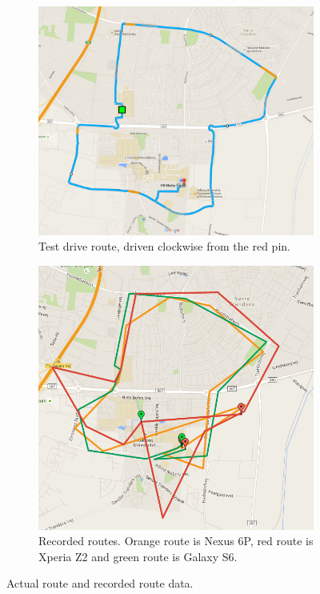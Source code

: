 \begin{figure}[h]
	\begin{subfigure}[b]{0.55\textwidth}
		\includegraphics[width=\textwidth, trim={0 0 1cm 0},clip]{figures/testroute.png}
		\caption{Test drive route, driven clockwise from the red pin.}
		\label{fig:testroute}
	\end{subfigure}
	\begin{subfigure}[b]{0.44\textwidth}
		\includegraphics[width=\textwidth, trim={0 0 2cm 1.2cm},clip]{figures/testRouteRecordings.png}
		\caption{Recorded routes. Orange route is Nexus 6P, red route is Xperia Z2 and green route is Galaxy S6.}
		\label{fig:testrouterecordings}
	\end{subfigure}
	\caption{Actual route and recorded route data.}
\end{figure}

